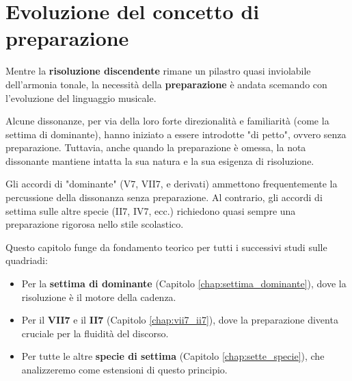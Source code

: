 \section{Evoluzione del concetto di preparazione}
\label{sec:evoluzione_preparazione}

Mentre la \textbf{risoluzione discendente} rimane un pilastro quasi inviolabile dell'armonia tonale, la necessità della \textbf{preparazione} è andata scemando con l'evoluzione del linguaggio musicale.

Alcune dissonanze, per via della loro forte direzionalità e familiarità (come la settima di dominante), hanno iniziato a essere introdotte "di petto", ovvero senza preparazione. Tuttavia, anche quando la preparazione è omessa, la nota dissonante mantiene intatta la sua natura e la sua esigenza di risoluzione.

\begin{regola}
        \label{reg:dissonanze_non_preparate}
        Gli accordi di "dominante" (V7, VII7, e derivati) ammettono frequentemente la percussione della dissonanza senza preparazione. Al contrario, gli accordi di settima sulle altre specie (II7, IV7, ecc.) richiedono quasi sempre una preparazione rigorosa nello stile scolastico.
\end{regola}

Questo capitolo funge da fondamento teorico per tutti i successivi studi sulle quadriadi:
\begin{itemize}
        \item Per la \textbf{settima di dominante} (Capitolo \ref{chap:settima_dominante}), dove la risoluzione è il motore della cadenza.
        \item Per il \textbf{VII7} e il \textbf{II7} (Capitolo \ref{chap:vii7_ii7}), dove la preparazione diventa cruciale per la fluidità del discorso.
        \item Per tutte le altre \textbf{specie di settima} (Capitolo \ref{chap:sette_specie}), che analizzeremo come estensioni di questo principio.
\end{itemize}
